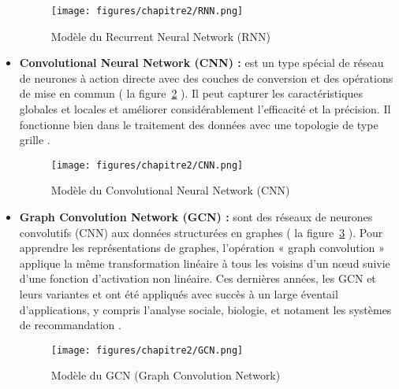 \begin{itemize}
		\begin{figure}[H]
        	\begin{center}
        		\texttt{[image: figures/chapitre2/RNN.png]}
        	\end{center}
        	\caption {Modèle du Recurrent Neural Network (RNN) \cite{ch2ref12}}
        	\label{fig:RNN}
        \end{figure}		
		
		\item \textbf{Convolutional Neural Network (CNN) :} est un type spécial de réseau de neurones à action directe avec des couches de conversion et des opérations de mise en commun ( la figure~\ref{fig:CNN} ). Il peut  capturer les caractéristiques globales et locales et améliorer considérablement l'efficacité et la précision. Il fonctionne bien dans le traitement des données avec une topologie de type grille \cite{ch2ref4}.

		\begin{figure}[H]
        	\begin{center}
        		\texttt{[image: figures/chapitre2/CNN.png]}
        	\end{center}
        	\caption {Modèle du Convolutional Neural Network (CNN) \cite{ch2ref12}}
        	\label{fig:CNN}
        \end{figure}

		\item \textbf{Graph Convolution Network (GCN) :} sont des réseaux de neurones convolutifs (CNN) aux données structurées en graphes ( la figure~\ref{fig:GCN} ). Pour apprendre les représentations de graphes, l'opération « graph convolution » applique la même transformation linéaire à tous les voisins d'un nœud suivie d'une fonction d'activation non linéaire. Ces dernières années, les GCN et leurs variantes et ont été appliqués avec succès à un large éventail d'applications, y compris l'analyse sociale, biologie, et notament les systèmes de recommandation \cite{ch2ref3}. 

		\begin{figure}[H]
        	\begin{center}
        		\texttt{[image: figures/chapitre2/GCN.png]}
        	\end{center}
        	\caption {Modèle du GCN (Graph Convolution Network) \cite{ch2ref12}}
        	\label{fig:GCN}
        \end{figure}

    \end{itemize}
    
